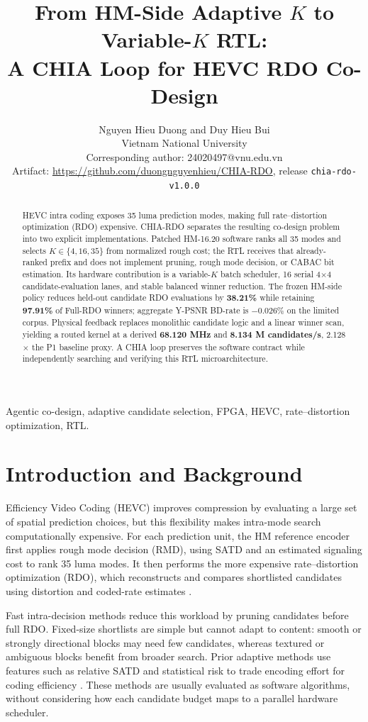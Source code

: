 \documentclass[journal]{IEEEtran}
\title{From HM-Side Adaptive $K$ to Variable-$K$ RTL:\\
A CHIA Loop for HEVC RDO Co-Design}
\author{Nguyen Hieu Duong and Duy Hieu Bui\\
\normalsize Vietnam National University\\
\normalsize Corresponding author: 24020497@vnu.edu.vn\\
\footnotesize Artifact: \url{https://github.com/duongnguyenhieu/CHIA-RDO},
release \texttt{chia-rdo-v1.0.0}}
\newcommand{\project}{\textsc{CHIA-RDO}\xspace}
\newcommand{\metric}[1]{\textbf{#1}}
\begin{document}
\maketitle

\begin{abstract}
HEVC intra coding exposes 35 luma prediction modes, making full
rate--distortion optimization (RDO) expensive. \project separates the resulting
co-design problem into two explicit implementations. Patched HM-16.20 software
ranks all 35 modes and selects $K\in\{4,16,35\}$ from normalized rough cost;
the RTL receives that already-ranked prefix and does not implement pruning,
rough mode decision, or CABAC bit estimation. Its hardware contribution is a
variable-$K$ batch scheduler, 16 serial 4$\times$4 candidate-evaluation lanes,
and stable balanced winner reduction. The frozen HM-side policy reduces
held-out candidate RDO evaluations by \metric{38.21\%} while retaining
\metric{97.91\%} of Full-RDO winners; aggregate Y-PSNR BD-rate is $-0.026\%$ on
the limited corpus. Physical feedback replaces monolithic candidate logic and
a linear winner scan, yielding a routed kernel at a derived
\metric{68.120 MHz} and \metric{8.134 M candidates/s}, 2.128$\times$ the P1
baseline proxy. A CHIA loop preserves the software contract while independently
searching and verifying this RTL microarchitecture.
\end{abstract}

\begin{IEEEkeywords}
Agentic co-design, adaptive candidate selection, FPGA, HEVC, rate--distortion
optimization, RTL.
\end{IEEEkeywords}

\section{Introduction and Background}
 Efficiency Video Coding (HEVC) improves compression by
evaluating a large set of spatial prediction choices, but this flexibility
makes intra-mode search computationally expensive. For each prediction unit,
the HM reference encoder first applies rough mode decision (RMD), using SATD
and an estimated signaling cost to rank 35 luma modes. It then performs the
more expensive rate--distortion optimization (RDO), which reconstructs and
compares shortlisted candidates using distortion and coded-rate estimates
\cite{hm1620}.

Fast intra-decision methods reduce this workload by pruning candidates before
full RDO. Fixed-size shortlists are simple but cannot adapt to content: smooth
or strongly directional blocks may need few candidates, whereas textured or
ambiguous blocks benefit from broader search. Prior adaptive methods use
features such as relative SATD and statistical risk to trade encoding effort
for coding efficiency \cite{gwon2019}. These methods are usually evaluated as
software algorithms, without considering how each candidate budget maps to a
parallel hardware scheduler.
\end{document}
